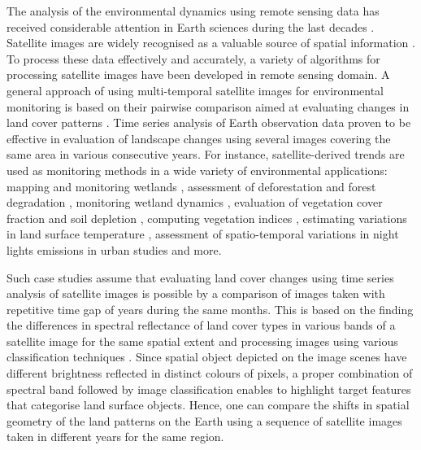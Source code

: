 \documentclass[12pt,a4paper,oneside]{article}
\def \newpar{\vspace{6pt}}
\begin{document}
\newpar The analysis of the environmental dynamics using remote sensing data has received considerable attention in Earth sciences during the last decades \citep{SULTANA2023267,PAYRA2023239,MERTIKAS2021107}. Satellite images are widely recognised as a valuable source of spatial information \citep{Richards,Costel,Lerat}. To process these data effectively and accurately, a variety of algorithms for processing satellite images have been developed in remote sensing domain. A general approach of using multi-temporal satellite images for environmental monitoring is based on their pairwise comparison aimed at evaluating changes in land cover patterns \citep{OGILVIE2015368,Hiernaux}. Time series analysis of Earth observation data proven to be effective in evaluation of landscape changes using several images covering the same area in various consecutive years. For instance, satellite-derived trends are used as monitoring methods in a wide variety of environmental applications: mapping and monitoring wetlands \cite{WU2018140}, assessment of deforestation and forest degradation \citep{MASOLELE2021112600,rs11242999,ijgi11110573,rs9090905}, monitoring wetland dynamics \citep{KOVACS2022113267,land11122137}, evaluation of vegetation cover fraction and soil depletion \cite{DUBE2017112,rs15010020}, computing vegetation indices \citep{VENTER2020106206,app122412554,f13122066}, estimating variations in land surface temperature \citep{CARRILLONIQUETE2022104280}, assessment of spatio-temporal variations in night lights emissions in urban studies \citep{Rehman} and more. 

\newpar Such case studies assume that evaluating land cover changes using time series analysis of satellite images is possible by a comparison of images taken with repetitive time gap of years during the same months. This is based on the finding the differences in spectral reflectance of land cover types in various bands of a satellite image for the same spatial extent and processing images using various classification techniques \citep{SHAHI202385,MERRY2023269,GANDHI201681}. Since spatial object depicted on the image scenes have different brightness reflected in distinct colours of pixels, a proper combination of spectral band followed by image classification enables to highlight target features that categorise land surface objects. Hence, one can compare the shifts in spatial geometry of the land patterns on the Earth using a sequence of satellite images taken in different years for the same region. 
\end{document}
